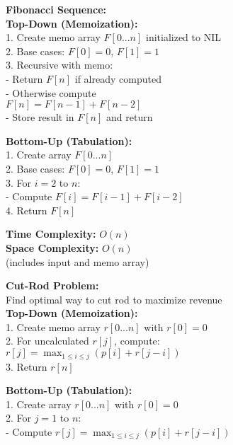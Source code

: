\documentclass[a4paper]{extarticle}
\newcommand{\algofont}{\fontsize{4.3pt}{4.7pt}\selectfont}
\newcommand{\algocode}[1]{%
  \vspace{0pt}%
  \begin{algorithm}[H]
    \setlength{\abovecaptionskip}{0pt}%
    \setlength{\belowcaptionskip}{0pt}
    \setlength{\intextsep}{0pt}%
    \setlength{\textfloatsep}{0pt}
    \algofont  %
  \end{algorithm}%
  \vspace{0pt}%
}
\begin{document}
\begin{paracol}{3}
{\begin{minipage}[t]{1\linewidth}
\begin{minipage}[t]{0.49\linewidth}
    \textbf{Fibonacci Sequence:}\\
    \textbf{Top-Down (Memoization):}\\
    1. Create memo array $F[0...n]$ initialized to NIL\\
    2. Base cases: $F[0] = 0$, $F[1] = 1$\\
    3. Recursive with memo:\\
    - Return $F[n]$ if already computed\\
    - Otherwise compute \\$F[n] = F[n-1] + F[n-2]$\\
    - Store result in $F[n]$ and return\\[-15px]
    \algocode{fib-memoized}\vspace*{-25px}
    \textbf{Bottom-Up (Tabulation):}\\
    1. Create array $F[0...n]$\\
    2. Base cases: $F[0] = 0$, $F[1] = 1$\\
    3. For $i = 2$ to $n$:\\
    - Compute $F[i] = F[i-1] + F[i-2]$\\
    4. Return $F[n]$\\[-15px]
    \algocode{fib-bottom-up}\vspace*{-20px}
    \textbf{Time Complexity:} $O(n)$\\
    \textbf{Space Complexity:} $O(n)$ \\(includes input and memo array)
    \end{minipage}
    \hfill
    \begin{minipage}[t]{0.49\linewidth}
    \textbf{Cut-Rod Problem:}\\
    Find optimal way to cut rod to maximize revenue\\
    \textbf{Top-Down (Memoization):}\\
    1. Create memo array $r[0...n]$ with $r[0] = 0$\\
    2. For uncalculated $r[j]$, compute:\\
    $r[j] = \max_{1\leq i\leq j}(p[i] + r[j-i])$\\
    3. Return $r[n]$\\[-17px]
    \algocode{rod-memoized}\vspace*{-25px}
    \textbf{Bottom-Up (Tabulation):}\\
    1. Create array $r[0...n]$ with $r[0] = 0$\\
    2. For $j = 1$ to $n$:\\
    - Compute $r[j] = \max_{1\leq i\leq j}(p[i] + r[j-i])$\\

\end{minipage}
\end{minipage}}
\end{paracol}
\end{document}
